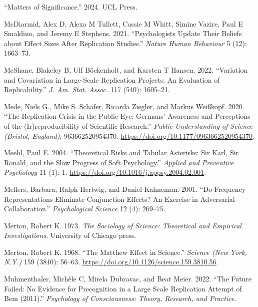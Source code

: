 \documentclass[
  letterpaper,
  DIV=11,
  numbers=noendperiod]{scrreprt}
\newlength{\cslhangindent}
\newenvironment{CSLReferences}[2] %
 {\begin{list}{}{%
  \setlength{\itemindent}{0pt}
  \setlength{\leftmargin}{0pt}
  \setlength{\parsep}{0pt}
  \ifodd #1
   \setlength{\leftmargin}{\cslhangindent}
   \setlength{\itemindent}{-1\cslhangindent}
  \fi
  \setlength{\itemsep}{#2\baselineskip}}}
 {\end{list}}
\begin{document}
\begin{CSLReferences}{1}{0}
{``Matters of Significance.''} 2024. UCL Press.

McDiarmid, Alex D, Alexa M Tullett, Cassie M Whitt, Simine Vazire, Paul
E Smaldino, and Jeremy E Stephens. 2021. {``Psychologists Update Their
Beliefs about Effect Sizes After Replication Studies.''} \emph{Nature
Human Behaviour} 5 (12): 1663--73.

McShane, Blakeley B, Ulf Böckenholt, and Karsten T Hansen. 2022.
{``Variation and Covariation in Large-Scale Replication Projects: An
Evaluation of Replicability.''} \emph{J. Am. Stat. Assoc.} 117 (540):
1605--21.

Mede, Niels G., Mike S. Schäfer, Ricarda Ziegler, and Markus Weißkopf.
2020. {``The {\textquotedbl}Replication Crisis{\textquotedbl} in the
Public Eye: Germans' Awareness and Perceptions of the
(Ir)reproducibility of Scientific Research.''} \emph{Public
Understanding of Science (Bristol, England)}, 963662520954370.
\url{https://doi.org/10.1177/0963662520954370}.

Meehl, Paul E. 2004. {``Theoretical Risks and Tabular Asterisks: Sir
Karl, Sir Ronald, and the Slow Progress of Soft Psychology.''}
\emph{Applied and Preventive Psychology} 11 (1): 1.
\url{https://doi.org/10.1016/j.appsy.2004.02.001}.

Mellers, Barbara, Ralph Hertwig, and Daniel Kahneman. 2001. {``Do
Frequency Representations Eliminate Conjunction Effects? An Exercise in
Adversarial Collaboration.''} \emph{Psychological Science} 12 (4):
269--75.

Merton, Robert K. 1973. \emph{The Sociology of Science: Theoretical and
Empirical Investigations}. University of Chicago press.

Merton, Robert K. 1968. {``The Matthew Effect in Science.''}
\emph{Science (New York, N.Y.)} 159 (3810): 56--63.
\url{https://doi.org/10.1126/science.159.3810.56}.

Muhmenthaler, Michèle C, Mirela Dubravac, and Beat Meier. 2022. {``The
Future Failed: No Evidence for Precognition in a Large Scale Replication
Attempt of Bem (2011).''} \emph{Psychology of Consciousness: Theory,
Research, and Practice}.


\end{CSLReferences}
\end{document}
